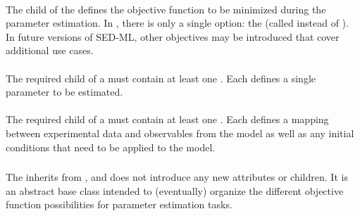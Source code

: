 \begin{blockChanged}
\paragraph*{}
The  child of the \ParameterEstimationTask defines the objective function to be minimized during the parameter estimation.  In \currentLV, there is only a single \Objective option: the \LeastSquareObjectiveFunction (called  instead of ).  In future versions of SED-ML, other objectives may be introduced that cover additional use cases.


\paragraph*{}
The required \ListOfAdjustableParameters child of a \ParameterEstimationTask must contain at least one \AdjustableParameter.  Each \AdjustableParameter defines a single parameter to be estimated.


\paragraph*{}
The required \ListOfFitExperiments child of a \ParameterEstimationTask must contain at least one \FitExperiment.  Each \FitExperiment defines a mapping between experimental data and observables from the model as well as any initial conditions that need to be applied to the model.


\subsubsection{}
\label{class:objective}

The \Objective inherits from \SedBase, and does not introduce any new attributes or children.  It is an abstract base class intended to (eventually) organize the different objective function possibilities for parameter estimation tasks.



\subsubsection{}
\label{class:leastSquareObjectiveFunction}


\end{blockChanged}
